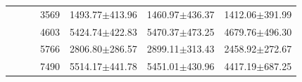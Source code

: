 \begin{table}[t]
\begin{tabular}{ccccccc}
                             &                       &                                 & 3569        & 1493.77$\pm$413.96                                                             & 1460.97$\pm$436.37                                                         & 1412.06$\pm$391.99                                                         \\
                             &                       &                                 & 4603        & 5424.74$\pm$422.83                                                             & 5470.37$\pm$473.25                                                         & 4679.76$\pm$496.30                                                         \\
                             &                       &                                 & 5766        & 2806.80$\pm$286.57                                                             & 2899.11$\pm$313.43                                                         & 2458.92$\pm$272.67                                                         \\
                             &                       &                                 & 7490        & 5514.17$\pm$441.78                                                             & 5451.01$\pm$430.96                                                         & 4417.19$\pm$687.25                                                         \\
        \bottomrule
    \end{tabular}

\end{table}
